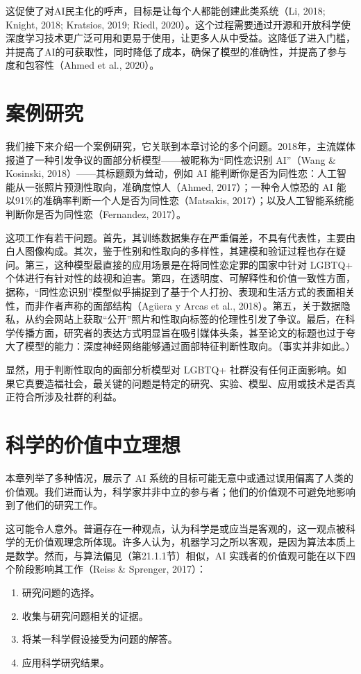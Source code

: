 \documentclass[lang=cn,newtx,10pt,scheme=chinese]{elegantbook}
\begin{document}
这促使了对AI民主化的呼声，目标是让每个人都能创建此类系统（Li, 2018; Knight, 2018; Kratsios, 2019; Riedl, 2020）。这个过程需要通过开源和开放科学使深度学习技术更广泛可用和更易于使用，让更多人从中受益。这降低了进入门槛，并提高了AI的可获取性，同时降低了成本，确保了模型的准确性，并提高了参与度和包容性（Ahmed et al., 2020）。

\section{案例研究}
我们接下来介绍一个案例研究，它关联到本章讨论的多个问题。2018年，主流媒体报道了一种引发争议的面部分析模型——被昵称为“同性恋识别 AI”（Wang \& Kosinski, 2018）——其标题颇为耸动，例如 AI 能判断你是否为同性恋：人工智能从一张照片预测性取向，准确度惊人（Ahmed, 2017）；一种令人惊恐的 AI 能以91\%的准确率判断一个人是否为同性恋（Matsakis, 2017）；以及人工智能系统能判断你是否为同性恋（Fernandez, 2017）。

这项工作有若干问题。首先，其训练数据集存在严重偏差，不具有代表性，主要由白人图像构成。其次，鉴于性别和性取向的多样性，其建模和验证过程也存在疑问。第三，这种模型最直接的应用场景是在将同性恋定罪的国家中针对 LGBTQ+ 个体进行有针对性的歧视和迫害。第四，在透明度、可解释性和价值一致性方面，据称，“同性恋识别”模型似乎捕捉到了基于个人打扮、表现和生活方式的表面相关性，而非作者声称的面部结构（Agüera y Arcas et al., 2018）。第五，关于数据隐私，从约会网站上获取“公开”照片和性取向标签的伦理性引发了争议。最后，在科学传播方面，研究者的表达方式明显旨在吸引媒体头条，甚至论文的标题也过于夸大了模型的能力：深度神经网络能够通过面部特征判断性取向。（事实并非如此。）

显然，用于判断性取向的面部分析模型对 LGBTQ+ 社群没有任何正面影响。如果它真要造福社会，最关键的问题是特定的研究、实验、模型、应用或技术是否真正符合所涉及社群的利益。

\section{科学的价值中立理想}
本章列举了多种情况，展示了 AI 系统的目标可能无意中或通过误用偏离了人类的价值观。我们进而认为，科学家并非中立的参与者；他们的价值观不可避免地影响到了他们的研究工作。

这可能令人意外。普遍存在一种观点，认为科学是或应当是客观的，这一观点被科学的无价值观理念所体现。许多人认为，机器学习之所以客观，是因为算法本质上是数学。然而，与算法偏见（第21.1.1节）相似，AI 实践者的价值观可能在以下四个阶段影响其工作（Reiss \& Sprenger, 2017）：

\begin{enumerate}
\item 研究问题的选择。
\item 收集与研究问题相关的证据。
\item 将某一科学假设接受为问题的解答。
\item 应用科学研究结果。
\end{enumerate}
\end{document}
